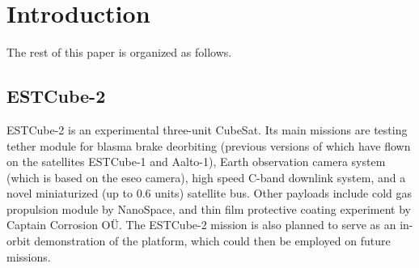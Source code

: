 \newpage
\section{Introduction}



The rest of this paper is organized as follows.


\subsection{ESTCube-2}

ESTCube-2 is an experimental three-unit CubeSat. Its main missions are testing tether module for blasma brake deorbiting (previous versions of which have flown on the satellites ESTCube-1 and Aalto-1), Earth observation camera system (which is based on the \gls{eseo} camera), high speed C-band downlink system, and a novel miniaturized (up to 0.6 units) satellite bus. Other payloads include cold gas propulsion module by NanoSpace, and thin film protective coating experiment by Captain Corrosion OÜ. The ESTCube-2 mission is also planned to serve as an in-orbit demonstration of the platform, which could then be employed on future missions. \cite{Iakubivskyi2016}

